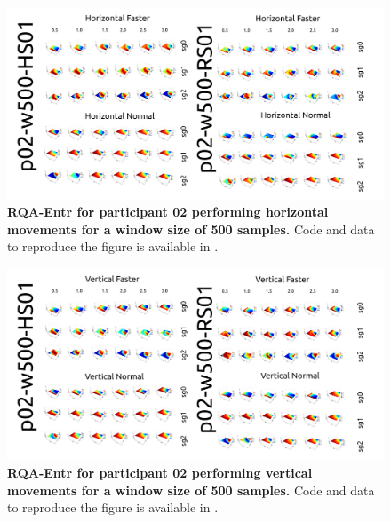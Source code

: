 \documentclass[12pt]{article}
\begin{document}
\newpage
\begin{figure}[ht!]
\centering
\includegraphics{figures/rqa/output/epsilons/rqa-epsilonsp02w500Horizontal}
    	\caption{
	{\bf RQA-Entr for participant 02 performing horizontal movements for a window size of 500 samples.}
	Code and data to reproduce the figure is available in \cite{srep2020}.
        }
    \label{fig-p02-H-w500}
\end{figure}
\begin{figure}[hb!]
\centering
\includegraphics{figures/rqa/output/epsilons/rqa-epsilonsp02w500Vertical}
    	\caption{
	{\bf RQA-Entr for participant 02 performing vertical movements for a window size of 500 samples.}
	Code and data to reproduce the figure is available in \cite{srep2020}.
        }
    \label{fig-p02-V-w500}
\end{figure}
\end{document}
